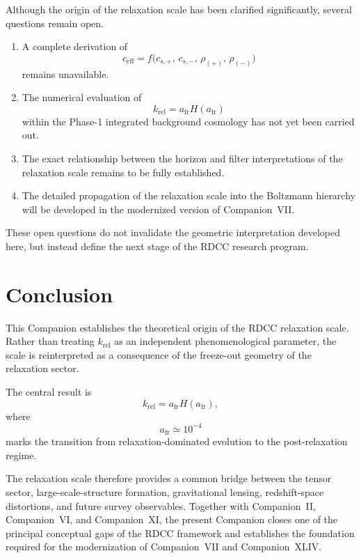 \documentclass[11pt,a4paper]{article}
\begin{document}
Although the origin of the relaxation scale has been clarified significantly,
several questions remain open.
\begin{enumerate}[label=\arabic*.]
  \item A complete derivation of
  \begin{equation}
    c_{\mathrm{eff}}
    =
    f\big(c_{s,+},\, c_{s,-},\, \rho_{(+)},\, \rho_{(-)}\big)
  \end{equation}
  remains unavailable.

  \item The numerical evaluation of
  \begin{equation}
    k_{\mathrm{rel}}
    =
    a_{\mathrm{fr}} H(a_{\mathrm{fr}})
  \end{equation}
  within the Phase-1 integrated background cosmology has not yet been carried
  out.

  \item The exact relationship between the horizon and filter interpretations
  of the relaxation scale remains to be fully established.

  \item The detailed propagation of the relaxation scale into the Boltzmann
  hierarchy will be developed in the modernized version of Companion~VII.
\end{enumerate}
These open questions do not invalidate the geometric interpretation developed
here, but instead define the next stage of the RDCC research program.

\section{Conclusion}

This Companion establishes the theoretical origin of the RDCC relaxation
scale. Rather than treating \(k_{\mathrm{rel}}\) as an independent
phenomenological parameter, the scale is reinterpreted as a consequence of the
freeze-out geometry of the relaxation sector.

The central result is
\begin{equation}
  k_{\mathrm{rel}}
  =
  a_{\mathrm{fr}} H(a_{\mathrm{fr}}),
\end{equation}
where
\begin{equation}
  a_{\mathrm{fr}} \simeq 10^{-4}
\end{equation}
marks the transition from relaxation-dominated evolution to the
post-relaxation regime.

The relaxation scale therefore provides a common bridge between the tensor
sector, large-scale-structure formation, gravitational lensing, redshift-space
distortions, and future survey observables. Together with Companion~II,
Companion~VI, and Companion~XI, the present Companion closes one of the
principal conceptual gaps of the RDCC framework and establishes the foundation
required for the modernization of Companion~VII and Companion~XLIV.
\end{document}
